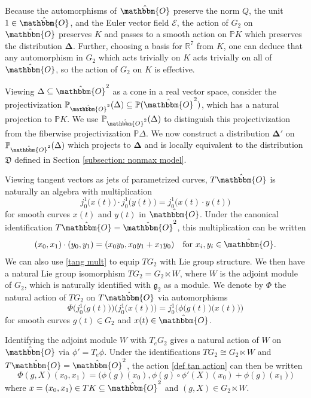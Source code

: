 \documentclass[11pt,letterpaper]{amsart}
\numberwithin{equation}{section}
\newcommand{\oct}{\hat{\mathbbm{O}}}
\begin{document}
Because the automorphisms of $\oct$ preserve the norm $Q$, the unit $1\in \oct$, and the Euler vector field $\mathcal{E}$, the action of $G_2$ on $\oct$ preserves $K$ and passes to a smooth action on $\mathbb{P} K$ which preserves the distribution $\boldsymbol{\Delta}$. Further, choosing a basis for $\mathbb R^7$ from $K$, one can deduce that any automorphism in $G_2$ which acts trivially on $K$ acts trivially on all of $\oct$, so the action of $G_2$ on $K$ is effective.

Viewing $\Delta\subseteq \oct^2$ as a cone in a real vector space, consider the projectivization $\mathbb P_{\oct^2}(\Delta)\subseteq \mathbb P(\oct^2)$, which has a natural projection to $\mathbb PK$. We use $\mathbb P_{\oct^2}(\Delta)$ to distinguish this projectivization from the fiberwise projectivization $\mathbb P \Delta$. We now construct a distribution $\boldsymbol{\Delta}'$ on $\mathbb P_{\oct^2}(\Delta)$ which projects to $\boldsymbol{\Delta}$ and is locally equivalent to the distribution $\mathfrak D$ defined in Section \ref{subsection: nonmax model}.

Viewing tangent vectors as jets of parametrized curves, $T\oct$ is naturally an algebra with multiplication
\begin{equation}
\label{tang mult}
    j^1_0\big(x(t)\big)\cdot j^1_0\big(y(t)\big) = j^1_0\big(x(t)\cdot y(t)\big)
\end{equation}
for smooth curves $x(t)$ and $y(t)$ in $\oct$. Under the canonical identification $T\oct = \oct ^2$, this multiplication can be written
\begin{equation}
    (x_0,x_1)\cdot (y_0,y_1) = (x_0y_0,x_0y_1+x_1y_0)\quad\text{for }x_i,y_i\in \oct.
\end{equation}
We can also use \eqref{tang mult} to equip $TG_2$ with Lie group structure. We then have a natural Lie group isomorphism $TG_2 = G_2\ltimes W$, where $W$ is the adjoint module of $G_2$, which is naturally identified with ${\mathfrak{g}}_2$ as a module. We denote by $\Phi$ the natural action of $TG_2$ on $T\oct$ via automorphisms 
\begin{equation}
\label{def tan action}
    \Phi\Big(j^1_0\big(g(t)\big)\Big)\Big(j^1_0\big(x(t)\big)\Big) = j^1_0\Big(\phi\big(g(t)\big)\big(x(t)\big)\Big)
\end{equation}
for smooth curves $g(t)\in G_2$ and $x(t)\in \oct$.

Identifying the adjoint module $W$ with $T_eG_2$ gives a natural action of $W$ on $\oct$ via $\phi'=T_e\phi$. Under the identifications $TG_2\cong G_2\ltimes W$ and $T\oct = \oct^2$, the action \eqref{def tan action} can then be written
\begin{equation}
\label{def TG action}
    \Phi(g, X)(x_0,x_1) = \Big(\phi(g)(x_0), \phi(g)\circ \phi'(X)(x_0) + \phi(g)(x_1)\Big)
\end{equation}
where $x = (x_0,x_1)\in TK\subseteq \oct^2$ and $(g,X)\in G_2\ltimes W$. 
\end{document}
